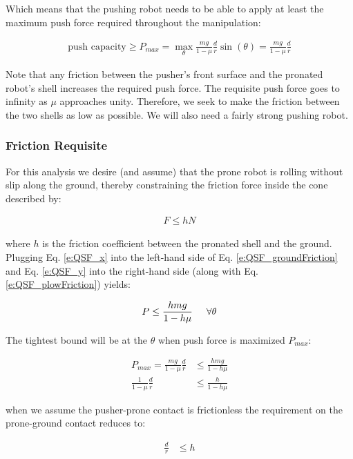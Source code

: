 \documentclass[letterpaper]{report}
\begin{document}
Which means that the pushing robot needs to be able to apply at least the maximum push force required throughout the manipulation:

\begin{align}
  \text{push capacity} \geq P_{max} = \max_\theta \frac{mg}{1-\mu} \frac{d}{r} \sin(\theta) = \frac{mg}{1-\mu} \frac{d}{r}
\end{align}

Note that any friction between the pusher's front surface and the pronated robot's shell increases the required push force.
The requisite push force goes to infinity as $\mu$ approaches unity.
Therefore, we seek to make the friction between the two shells as low as possible.
We will also need a fairly strong pushing robot.

\subsubsection{Friction Requisite}
For this analysis we desire (and assume) that the prone robot is rolling without slip along the ground, thereby constraining the friction force inside the cone described by:

\begin{align}
  F \leq h N \label{e:QSF_groundFriction}
\end{align}

where $h$ is the friction coefficient between the pronated shell and the ground.
Plugging Eq. \ref{e:QSF_x} into the left-hand side of Eq. \ref{e:QSF_groundFriction} and Eq. \ref{e:QSF_y} into the right-hand side (along with Eq. \ref{e:QSF_plowFriction}) yields:

\begin{align}
  P \leq \frac{hmg}{1-h\mu} \label{e:QSF_pushConstraint1} \hspace{5mm} \forall \theta
\end{align}

The tightest bound will be at the $\theta$ when push force is maximized $P_{max}$:

\begin{align}
  P_{max} = \frac{mg}{1-\mu} \frac{d}{r} &\leq \frac{hmg}{1-h\mu} \\
  \frac{1}{1-\mu} \frac{d}{r} &\leq \frac{h}{1-h\mu}
  \label{e:gndFrictionReq}
\end{align}

when we assume the pusher-prone contact is frictionless the requirement on the prone-ground contact reduces to:

\begin{align}
  \frac{d}{r} &\leq h
\end{align}
\end{document}

